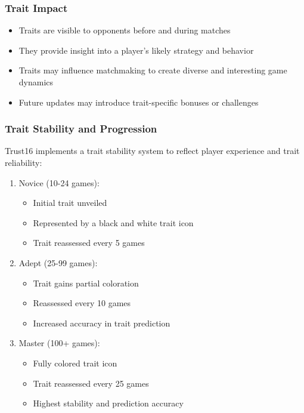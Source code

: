 \documentclass[]{article}
\begin{document}
\hypertarget{trait-impact}{%
\subsubsection{Trait Impact}\label{trait-impact}}

\begin{itemize}
\tightlist
\item
  Traits are visible to opponents before and during matches
\item
  They provide insight into a player's likely strategy and behavior
\item
  Traits may influence matchmaking to create diverse and interesting
  game dynamics
\item
  Future updates may introduce trait-specific bonuses or challenges
\end{itemize}

\hypertarget{trait-stability-and-progression}{%
\subsubsection{Trait Stability and
Progression}\label{trait-stability-and-progression}}

Trust16 implements a trait stability system to reflect player experience
and trait reliability:

\begin{enumerate}
\def\labelenumi{\arabic{enumi}.}
\tightlist
\item
  Novice (10-24 games):

  \begin{itemize}
  \tightlist
  \item
    Initial trait unveiled
  \item
    Represented by a black and white trait icon
  \item
    Trait reassessed every 5 games
  \end{itemize}
\item
  Adept (25-99 games):

  \begin{itemize}
  \tightlist
  \item
    Trait gains partial coloration
  \item
    Reassessed every 10 games
  \item
    Increased accuracy in trait prediction
  \end{itemize}
\item
  Master (100+ games):

  \begin{itemize}
  \tightlist
  \item
    Fully colored trait icon
  \item
    Trait reassessed every 25 games
  \item
    Highest stability and prediction accuracy
  \end{itemize}
\end{enumerate}
\end{document}
